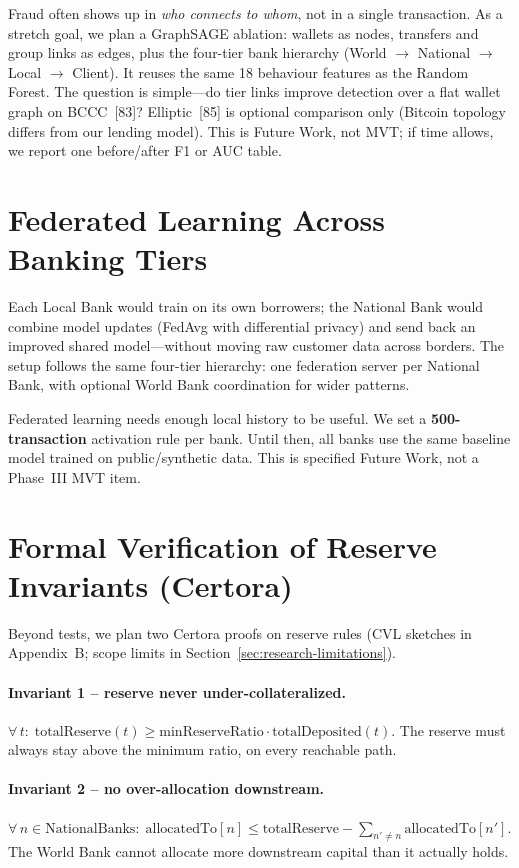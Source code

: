 \documentclass[12pt, a4paper]{report}
\begin{document}
Fraud often shows up in \textit{who connects to whom}, not in a single transaction. As a stretch goal, we plan a GraphSAGE ablation: wallets as nodes, transfers and group links as edges, plus the four-tier bank hierarchy (World $\to$ National $\to$ Local $\to$ Client). It reuses the same 18 behaviour features as the Random Forest. The question is simple---do tier links improve detection over a flat wallet graph on BCCC~[83]? Elliptic~[85] is optional comparison only (Bitcoin topology differs from our lending model). This is Future Work, not MVT; if time allows, we report one before/after F1 or AUC table.

\section{Federated Learning Across Banking Tiers}
\label{sec:fl-fraud}

Each Local Bank would train on its own borrowers; the National Bank would combine model updates (FedAvg with differential privacy) and send back an improved shared model---without moving raw customer data across borders. The setup follows the same four-tier hierarchy: one federation server per National Bank, with optional World Bank coordination for wider patterns.

Federated learning needs enough local history to be useful. We set a \textbf{500-transaction} activation rule per bank. Until then, all banks use the same baseline model trained on public/synthetic data. This is specified Future Work, not a Phase~III MVT item.

\section{Formal Verification of Reserve Invariants (Certora)}
\label{sec:certora}

Beyond tests, we plan two Certora proofs on reserve rules (CVL sketches in Appendix~B; scope limits in Section~\ref{sec:research-limitations}).

\paragraph{Invariant 1 -- reserve never under-collateralized.}
\(\forall\, t:\; \mathrm{totalReserve}(t) \ge \mathrm{minReserveRatio} \cdot \mathrm{totalDeposited}(t).\)
The reserve must always stay above the minimum ratio, on every reachable path.

\paragraph{Invariant 2 -- no over-allocation downstream.}
\(\forall\, n \in \mathrm{NationalBanks}:\; \mathrm{allocatedTo}[n] \le \mathrm{totalReserve} - \sum_{n' \ne n} \mathrm{allocatedTo}[n'].\)
The World Bank cannot allocate more downstream capital than it actually holds.
\end{document}
